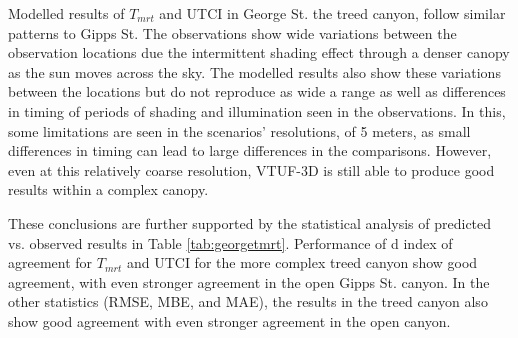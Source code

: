 \documentclass[final,3p,times,authoryear]{elsarticle}
\begin{document}




Modelled results of $T_{mrt}$ and UTCI in George St. the treed canyon, follow similar patterns to Gipps St. The observations show wide variations between the observation locations due the intermittent shading effect through a denser canopy as the sun moves across the sky. The modelled results also show these variations between the locations but do not reproduce as wide a range as well as differences in timing of periods of shading and illumination seen in the observations. In this, some limitations are seen in the scenarios' resolutions, of 5 meters, as small differences in timing can lead to large differences in the comparisons. However, even at this relatively coarse resolution, VTUF-3D is still able to produce good results within a complex canopy. 

These conclusions are further supported by the statistical analysis of predicted vs. observed results in Table \ref{tab:georgetmrt}. Performance of d index of agreement for $T_{mrt}$ and UTCI for the more complex treed canyon show good agreement, with even stronger agreement in the open Gipps St. canyon. In the other statistics (RMSE, MBE, and MAE), the results in the treed canyon also show good agreement with even stronger agreement in the open canyon.

\end{document}

